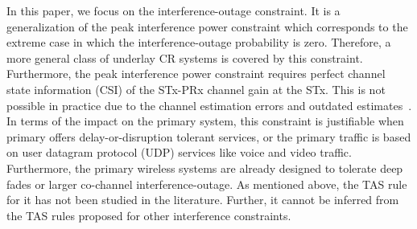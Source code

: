 \documentclass[12pt,draftcls,peerreview,onecolumn]{IEEEtran}
\begin{document}
In this paper, we focus on the interference-outage constraint. It is a generalization of the peak interference power constraint which corresponds to the extreme case in which the interference-outage probability is zero. Therefore, a more general class of underlay CR systems is covered by this constraint. Furthermore, the peak interference power constraint requires perfect channel state information (CSI) of the STx-PRx channel gain at the STx. This is not possible in practice due to the channel estimation errors and outdated estimates~\cite{musavian_2009_tcom,Suraweera_2010_TVT,Peng_2016_eurasip}. In terms of the impact on the primary system, this constraint is justifiable when primary offers delay-or-disruption tolerant services, or the primary traffic is based on user datagram protocol (UDP) services like voice and video traffic. Furthermore, the primary wireless systems are already designed to tolerate deep fades or larger co-channel interference-outage. As mentioned above, the TAS rule for it has not been studied in the literature. Further, it cannot be inferred from the TAS rules proposed for other interference constraints. 
\end{document}
